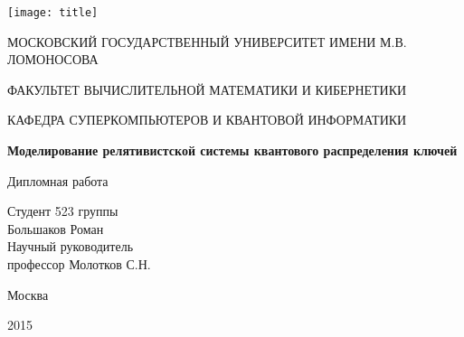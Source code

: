 
\begin{titlepage}
  \small{
      \centerline{\texttt{[image: title]}}
      \centerline{МОСКОВСКИЙ ГОСУДАРСТВЕННЫЙ УНИВЕРСИТЕТ ИМЕНИ М.В. ЛОМОНОСОВА}
      \centerline{ФАКУЛЬТЕТ ВЫЧИСЛИТЕЛЬНОЙ МАТЕМАТИКИ И КИБЕРНЕТИКИ}
      \centerline{КАФЕДРА СУПЕРКОМПЬЮТЕРОВ И КВАНТОВОЙ ИНФОРМАТИКИ}
    }
  \centerline{\hfill\hrulefill\hrulefill\hfill}
  \vfill
  \vfill
  \vfill
  \large
  \vfill
  \Large
  \begin{center}
  {\bf{Моделирование релятивистской системы квантового распределения ключей}}
  \end{center}
  \normalsize
  \vfill
  \vfill
  \centerline{Дипломная работа}
  \vfill
  \vfill
  \begin{flushright}
  Студент 523 группы\\
  Большаков Роман\\
   \vfill
   \vfill
  Научный руководитель\\
  профессор Молотков С.Н.
  \end{flushright}
  \vfill
  \vfill
  \centerline{Москва}
  \centerline{2015}
  \end{titlepage}

